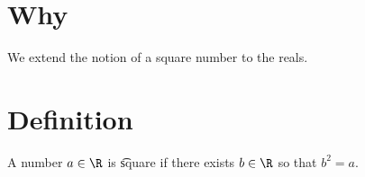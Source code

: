 
\section*{Why}

We extend the notion of a square number to the reals.

\section*{Definition}

A number $a \in \R $ is \t{square} if there exists $b \in \R $ so that $b^2 = a$.

\blankpage